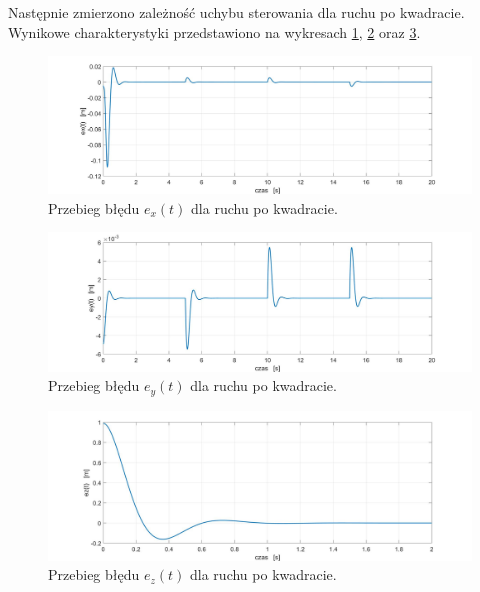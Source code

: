 \documentclass[eng,printmode]{mgr}
\begin{document}
Następnie zmierzono zależność uchybu sterowania dla ruchu po kwadracie. Wynikowe charakterystyki przedstawiono na wykresach \ref{exkw}, \ref{eykw} oraz \ref{ezkw}.
\hfill \break
\begin{figure}[!h]
\centering
\includegraphics[width=1\textwidth]{exkw.jpg}
\caption{\label{exkw}Przebieg błędu $e_x(t)$ dla ruchu po kwadracie.}
\end{figure}
\begin{figure}[!h]
\centering
\includegraphics[width=1\textwidth]{eykw.jpg}
\caption{\label{eykw}Przebieg błędu $e_y(t)$ dla ruchu po kwadracie.}
\end{figure}
\begin{figure}[!h]
\centering
\includegraphics[width=1\textwidth]{ezkw.jpg}
\caption{\label{ezkw}Przebieg błędu $e_z(t)$ dla ruchu po kwadracie.}
\end{figure}













\newpage
\newpage
\end{document}

